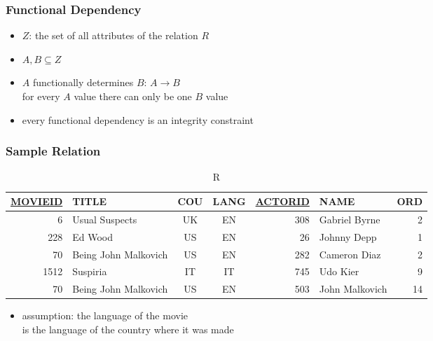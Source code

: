 \documentclass[dvipsnames]{beamer}
\begin{document}
\begin{frame}
  \frametitle{Functional Dependency}

  \begin{definition}
    \begin{itemize}
      \item $Z$: the set of all attributes of the relation $R$
      \item $A,B \subseteq Z$

      \pause
      \item \alert{$A$ functionally determines $B$}: $A \rightarrow B$\\
        for every $A$ value there can only be one $B$ value
    \end{itemize}
  \end{definition}

  \pause
  \begin{itemize}
    \item every functional dependency is an integrity constraint
  \end{itemize}
\end{frame}

\begin{frame}
  \frametitle{Sample Relation}

  \begin{example}
    \begin{tiny}
    \begin{table}
      \caption{R}
      \begin{tabular}{|r|l|c|c|r|l|r|}\hline
\underline{MOVIEID} & TITLE    & COU & LANG & \underline{ACTORID} & NAME & ORD\\[2pt]\hline\hline
      6 & Usual Suspects       & UK  &  EN  &     308 & Gabriel Byrne    &   2\\\hline
    228 & Ed Wood              & US  &  EN  &      26 & Johnny Depp      &   1\\\hline
     70 & Being John Malkovich & US  &  EN  &     282 & Cameron Diaz     &   2\\\hline
   1512 & Suspiria             & IT  &  IT  &     745 & Udo Kier         &   9\\\hline
     70 & Being John Malkovich & US  &  EN  &     503 & John Malkovich   &  14\\\hline
      \end{tabular}
    \end{table}
    \end{tiny}

    \pause
    \begin{itemize}
      \item assumption: the language of the movie\\
	is the language of the country where it was made
    \end{itemize}
  \end{example}
\end{frame}
\end{document}
